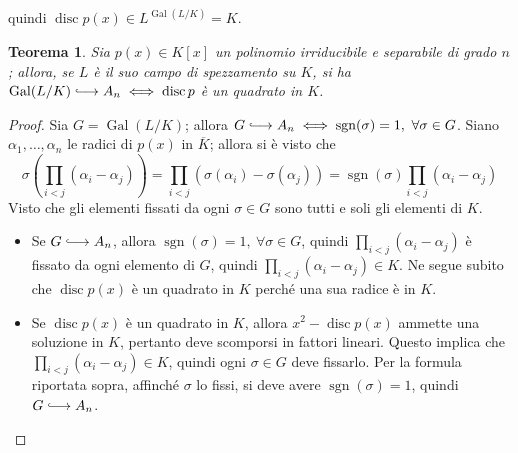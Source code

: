\documentclass[12pt]{scrartcl}
\theoremstyle{style}
\newtheorem{teorema}{Teorema}[section]
\numberwithin{equation}{subsection}
\newcommand{\longhookrightarrow}{\lhook\joinrel\longrightarrow}
\begin{document}
quindi $\operatorname{disc} p(x) \in L^{\operatorname{Gal}( L / K)}  = K$.
\begin{teorema}
	Sia $p(x) \in K[x]$ un polinomio irriducibile e separabile di grado $n$; allora, se $L$ \`e il suo campo di spezzamento su $K$, si ha $\operatorname{Gal} (L/K) \longhookrightarrow A_n \iff\operatorname{disc} p $ \`e un quadrato in $K$.
\end{teorema}
\begin{proof}
Sia $G = \operatorname{Gal}( L / K)$; allora $G \longhookrightarrow A_n\iff \operatorname{sgn} (\sigma )=1, \ \forall \sigma \in G$.
Siano $\alpha _1,\ldots,\alpha _n$ le radici di $p(x)$ in $\overline{K}$; allora si \`e visto che 
\[
\sigma \left(\prod_{i<j} (\alpha _i-\alpha _j)\right) =\prod_{i<j} (\sigma (\alpha _i) - \sigma (\alpha _j)) = \operatorname{sgn} (\sigma ) \prod_{i<j} (\alpha _i -\alpha _j)
\] 
Visto che gli elementi fissati da ogni $\sigma \in G$ sono tutti e soli gli elementi di $K$.
\begin{itemize}
	\item[$(\Rightarrow)$] Se $G \longhookrightarrow A_n$, allora $\operatorname{sgn} (\sigma ) = 1, \ \forall \sigma \in G$, quindi $\prod_{i<j} (\alpha _i-\alpha _j)$ \`e fissato da ogni elemento di $G$, quindi $\prod_{i<j} (\alpha _i-\alpha _j) \in K$.
		Ne segue subito che $\operatorname{disc} p(x)$ \`e un quadrato in $K$ perch\'e una sua radice \`e in $K$.
	\item[$(\Leftarrow)$] Se $\operatorname{disc} p(x)$ \`e un quadrato in $K$, allora $x^2 - \operatorname{disc} p(x)$ ammette una soluzione in $K$, pertanto deve scomporsi in fattori lineari.
		Questo implica che $\prod_{i<j} (\alpha _i-\alpha _j)\in K$, quindi ogni $\sigma \in G$ deve fissarlo. 
		Per la formula riportata sopra, affinch\'e $\sigma $ lo fissi, si deve avere $\operatorname{sgn} (\sigma )=1$, quindi $G \longhookrightarrow A_n$.
\end{itemize}
\end{proof}
\end{document}
